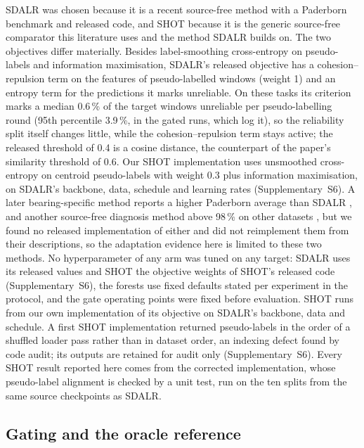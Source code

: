 SDALR was chosen because it is a recent source-free method with a Paderborn benchmark and released code, and SHOT
\cite{liang2020shot} because it is the generic source-free comparator this literature uses and the method SDALR builds on.
The two objectives differ materially. Besides label-smoothing cross-entropy on pseudo-labels and information
maximisation, SDALR's released objective has a cohesion--repulsion term on the features of pseudo-labelled windows
(weight 1) and an entropy term for the predictions it marks unreliable. On these tasks its criterion marks a median
0.6\,\% of the target windows unreliable per pseudo-labelling round (95th percentile 3.9\,\%, in the gated runs, which
log it), so the reliability split itself changes little, while the cohesion--repulsion term stays active; the released
threshold of 0.4 is a cosine distance, the counterpart of the paper's similarity threshold of 0.6. Our SHOT
implementation uses unsmoothed cross-entropy on centroid pseudo-labels with weight 0.3 plus information maximisation,
on SDALR's backbone, data, schedule and learning rates (Supplementary~S6). A later bearing-specific method
reports a higher Paderborn average than SDALR \cite{yan2026hybrid}, and another source-free diagnosis method above 98\,\% on other
datasets \cite{li2025csad}, but we found no released implementation of either and did not reimplement them from their descriptions, so the adaptation evidence here is limited to
these two methods. No hyperparameter of any arm was tuned on any target: SDALR uses its released values and SHOT the objective weights
of SHOT's released code (Supplementary~S6), the forests use fixed defaults stated per experiment in the protocol, and the gate operating points were
fixed before evaluation. SHOT runs from our own implementation of its objective on SDALR's backbone, data and schedule.
A first SHOT implementation returned pseudo-labels in the order of a shuffled loader pass rather than in dataset order, an indexing defect found by code audit; its outputs are retained for audit only (Supplementary~S6). Every SHOT result reported here comes from the corrected implementation, whose pseudo-label alignment is checked by a unit test, run on the ten splits from the same source checkpoints as SDALR.

\subsection{Gating and the oracle reference}

